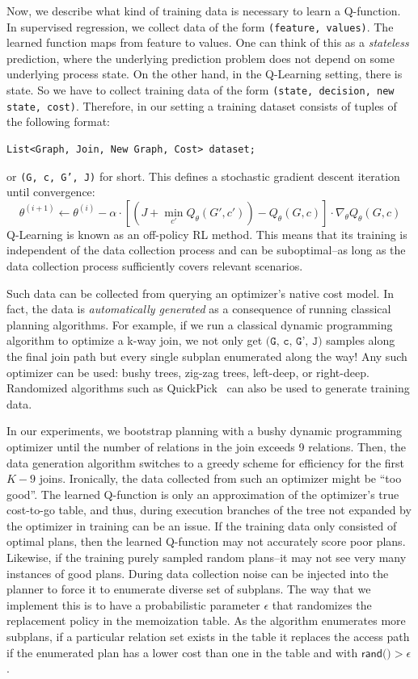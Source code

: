 Now, we describe what kind of training data is necessary to learn a Q-function. In supervised regression, we collect data of the form \texttt{(feature, values)}. The learned function maps from feature to values. One can think of this as a \emph{stateless} prediction, where the underlying prediction problem does not depend on some underlying process state. On the other hand, in the Q-Learning setting, there is state. So we have to collect training data of the form \texttt{(state, decision, new state, cost)}. Therefore, in our setting a training dataset consists of tuples of the following format:
\begin{lstlisting}
List<Graph, Join, New Graph, Cost> dataset;
\end{lstlisting}
or \texttt{(G, c, G', J)} for short. This defines a stochastic gradient descent iteration until convergence:
\[
\theta^{(i+1)} \leftarrow \theta^{(i)} - \alpha \cdot [ (J + \min_{c'} Q_\theta(G',c')) - Q_\theta(G,c) ] \cdot \nabla_\theta Q_\theta(G,c) 
\]
Q-Learning is known as an off-policy RL method. This means that its training is independent of the data collection process and can be suboptimal--as long as the data collection process sufficiently covers relevant scenarios. 

Such data can be collected from querying an optimizer's native cost model. In fact, the data is \emph{automatically generated} as a consequence of running classical planning algorithms. For example, if we run a classical dynamic programming algorithm to optimize a k-way join, we not only get $\texttt{(G, c, G', J)}$ samples along the final join path but every single subplan enumerated along the way! Any such optimizer can be used: bushy trees, zig-zag trees, left-deep, or right-deep. Randomized algorithms such as QuickPick~\cite{waas2000join} can also be used to generate training data. 

In our experiments, we bootstrap planning with a bushy dynamic programming optimizer until the number of relations in the join exceeds 9 relations.  Then, the data generation algorithm switches to a greedy scheme for efficiency for the first $K-9$ joins.
Ironically, the data collected from such an optimizer might be ``too good''.
The learned Q-function is only an approximation of the optimizer's true cost-to-go table, and thus, during execution branches of the tree not expanded by the optimizer in training can be an issue.
If the training data only consisted of optimal plans, then the learned Q-function may not accurately score poor plans. Likewise, if the training purely sampled random plans--it may not see very many instances of good plans.
During data collection noise can be injected into the planner to force it to enumerate diverse set of subplans.
The way that we implement this is to have a probabilistic parameter $\epsilon$ that randomizes the replacement policy in the memoization table.
As the algorithm enumerates more subplans, if a particular relation set exists in the table it replaces the access path if the enumerated plan has a lower cost than one in the table and with $\textsf{rand()} > \epsilon$.

